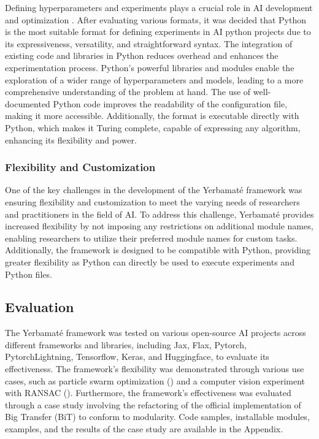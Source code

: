 Defining hyperparameters and experiments plays a crucial role in AI development and optimization \cite{wu2019hyperparameter}. After evaluating various formats, it was decided that Python is the most suitable format for defining experiments in AI python projects due to its expressiveness, versatility, and straightforward syntax. The integration of existing code and libraries in Python reduces overhead and enhances the experimentation process. Python's powerful libraries and modules enable the exploration of a wider range of hyperparameters and models, leading to a more comprehensive understanding of the problem at hand. The use of well-documented Python code improves the readability of the configuration file, making it more accessible. Additionally, the format is executable directly with Python, which makes it Turing complete, capable of expressing any algorithm, enhancing its flexibility and power.


\subsubsection{Flexibility and Customization}

One of the key challenges in the development of the Yerbamaté framework was ensuring flexibility and customization to meet the varying needs of researchers and practitioners in the field of AI. To address this challenge, Yerbamaté provides increased flexibility by not imposing any restrictions on additional module names, enabling researchers to utilize their preferred module names for custom tasks. Additionally, the framework is designed to be compatible with Python, providing greater flexibility as Python can directly be used to execute experiments and Python files.

\subsection{Evaluation}

The Yerbamaté framework was tested on various open-source AI projects across different frameworks and libraries, including Jax, Flax, Pytorch, Pytorch\-Lightning, Tensorflow, Keras, and Huggingface, to evaluate its effectiveness. The framework's flexibility was demonstrated through various use cases, such as particle swarm optimization (\cite{kennedy1995particle}) and a computer vision experiment with RANSAC (\cite{lowe2004distinctive}). Furthermore, the framework's effectiveness was evaluated through a case study involving the refactoring of the official implementation of Big Transfer (BiT) to conform to modularity. Code samples, installable modules, examples, and the results of the case study are available in the Appendix.
